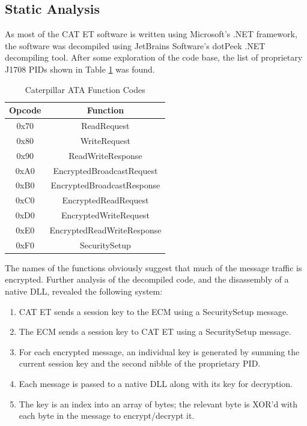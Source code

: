 \subsection{Static Analysis}

As most of the CAT ET software is written using Microsoft's .NET framework, the software was decompiled
using JetBrains Software's dotPeek .NET decompiling tool. After some exploration of the code base,
the list of proprietary J1708 PIDs shown in Table \ref{tab:catet} was found.

\begin{table}[h]
  \centering
   \begin{tabular}{|c|c|}
    \hline
    Opcode & Function \\
    \hline
    0x70 & ReadRequest \\
    \hline
    0x80 & WriteRequest \\
    \hline
    0x90 & ReadWriteResponse\\
    \hline
    0xA0 & EncryptedBroadcastRequest\\
    \hline
    0xB0 & EncryptedBroadcastResponse\\
    \hline
    0xC0 & EncryptedReadRequest\\
    \hline
    0xD0 & EncryptedWriteRequest\\
    \hline
    0xE0 & EncryptedReadWriteResponse\\
    \hline
    0xF0 & SecuritySetup\\
    \hline
   \end{tabular}

\caption{Caterpillar ATA Function Codes}
\label{tab:catet}
\end{table}

The names of the functions obviously suggest that much of the message traffic is encrypted. Further analysis of the
decompiled code, and the disassembly of a native DLL,  revealed the following system:

\begin{enumerate}
  \item CAT ET sends a session key to the ECM using a SecuritySetup message.
  \item The ECM sends a session key to CAT ET using a SecuritySetup message.
  \item For each encrypted message, an individual key is generated by summing the
        current session key and the second nibble of the proprietary PID.
  \item Each message is passed to a native DLL along with its key for decryption.
  \item The key is an index into an array of bytes; the relevant byte is XOR'd
        with each byte in the message to encrypt/decrypt it.
\end{enumerate}


